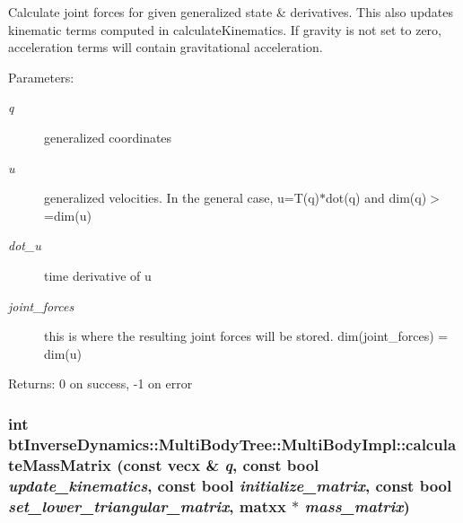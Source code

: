 Calculate joint forces for given generalized state \& derivatives. This also updates kinematic terms computed in calculateKinematics. If gravity is not set to zero, acceleration terms will contain gravitational acceleration. \begin{Desc}
\item[Parameters:]
\begin{description}
\item[{\em q}]generalized coordinates \item[{\em u}]generalized velocities. In the general case, u=T(q)$\ast$dot(q) and dim(q)$>$=dim(u) \item[{\em dot\_\-u}]time derivative of u \item[{\em joint\_\-forces}]this is where the resulting joint forces will be stored. dim(joint\_\-forces) = dim(u) \end{description}
\end{Desc}
\begin{Desc}
\item[Returns:]0 on success, -1 on error \end{Desc}
 \hypertarget{classbt_inverse_dynamics_1_1_multi_body_tree_1_1_multi_body_impl_6e4b376b92377b3350d4ebfd94652a0f}{
\subsubsection[calculateMassMatrix]{\setlength{\rightskip}{0pt plus 5cm}int btInverseDynamics::MultiBodyTree::MultiBodyImpl::calculateMassMatrix (const vecx \& {\em q}, \/  const bool {\em update\_\-kinematics}, \/  const bool {\em initialize\_\-matrix}, \/  const bool {\em set\_\-lower\_\-triangular\_\-matrix}, \/  matxx $\ast$ {\em mass\_\-matrix})}}
\label{classbt_inverse_dynamics_1_1_multi_body_tree_1_1_multi_body_impl_6e4b376b92377b3350d4ebfd94652a0f}


